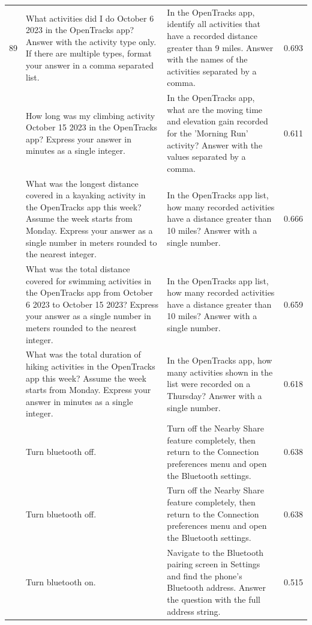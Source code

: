 \documentclass{article} %
\begin{document}
\begin{scriptsize}
\begin{longtable}{@{} c >{\raggedright\arraybackslash}p{} >{\raggedright\arraybackslash}p{} c @{}}
89 & What activities did I do October 6 2023 in the OpenTracks app? Answer with the activity type only. If there are multiple types, format your answer in a comma separated list. & In the OpenTracks app, identify all activities that have a recorded distance greater than 9 miles. Answer with the names of the activities separated by a comma. & 0.693 \\
\addlinespace[2pt]
90 & How long was my climbing activity October 15 2023 in the OpenTracks app? Express your answer in minutes as a single integer. & In the OpenTracks app, what are the moving time and elevation gain recorded for the 'Morning Run' activity? Answer with the values separated by a comma. & 0.611 \\
\addlinespace[2pt]
91 & What was the longest distance covered in a kayaking activity in the OpenTracks app this week? Assume the week starts from Monday. Express your answer as a single number in meters rounded to the nearest integer. & In the OpenTracks app list, how many recorded activities have a distance greater than 10 miles? Answer with a single number. & 0.666 \\
\addlinespace[2pt]
92 & What was the total distance covered for swimming activities in the OpenTracks app from October 6 2023 to October 15 2023? Express your answer as a single number in meters rounded to the nearest integer. & In the OpenTracks app list, how many recorded activities have a distance greater than 10 miles? Answer with a single number. & 0.659 \\
\addlinespace[2pt]
93 & What was the total duration of hiking activities in the OpenTracks app this week? Assume the week starts from Monday. Express your answer in minutes as a single integer. & In the OpenTracks app, how many activities shown in the list were recorded on a Thursday? Answer with a single number. & 0.618 \\
\addlinespace[2pt]
94 & Turn bluetooth off. & Turn off the Nearby Share feature completely, then return to the Connection preferences menu and open the Bluetooth settings. & 0.638 \\
\addlinespace[2pt]
95 & Turn bluetooth off. & Turn off the Nearby Share feature completely, then return to the Connection preferences menu and open the Bluetooth settings. & 0.638 \\
\addlinespace[2pt]
96 & Turn bluetooth on. & Navigate to the Bluetooth pairing screen in Settings and find the phone's Bluetooth address. Answer the question with the full address string. & 0.515 \\

\end{longtable}
\end{scriptsize}
\end{document}
